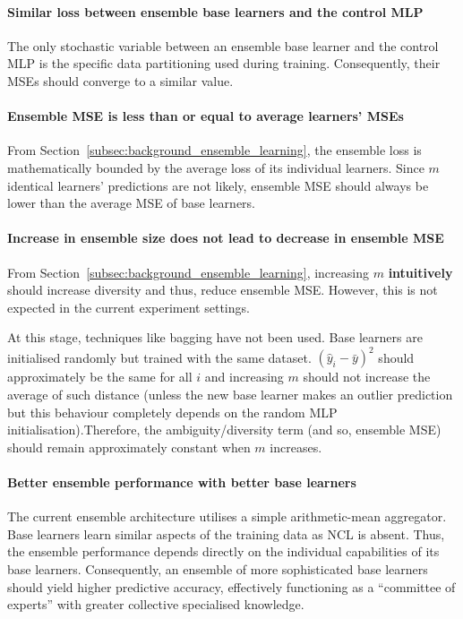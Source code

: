 \paragraph{Similar loss between ensemble base learners and the control MLP}
The only stochastic variable between an ensemble base learner and the control MLP is the specific data partitioning used during training. Consequently, their MSEs should converge to a similar value. 

\paragraph{Ensemble MSE is less than or equal to average learners' MSEs}
From Section~\ref{subsec:background_ensemble_learning}, the ensemble loss is mathematically bounded by the average loss of its individual learners. Since $m$ identical learners' predictions are not likely, ensemble MSE should always be lower than the average MSE of base learners. 

\paragraph{Increase in ensemble size does not lead to decrease in ensemble MSE}
From Section~\ref{subsec:background_ensemble_learning}, increasing $m$ \textbf{intuitively} should increase diversity and thus, reduce ensemble MSE. However, this is not expected in the current experiment settings. 

At this stage, techniques like bagging have not been used. Base learners are initialised randomly but trained with the same dataset. $(\hat{y}_i - \bar{y})^2$ should approximately be the same for all $i$ and increasing $m$ should not increase the average of such distance (unless the new base learner makes an outlier prediction but this behaviour completely depends on the random MLP initialisation).Therefore, the ambiguity/diversity term (and so, ensemble MSE) should remain approximately constant when $m$ increases. 

\paragraph{Better ensemble performance with better base learners}
The current ensemble architecture utilises a simple arithmetic-mean aggregator. Base learners learn similar aspects of the training data as NCL is absent. Thus, the ensemble performance depends directly on the individual capabilities of its base learners. Consequently, an ensemble of more sophisticated base learners should yield higher predictive accuracy, effectively functioning as a ``committee of experts'' with greater collective specialised knowledge. 


